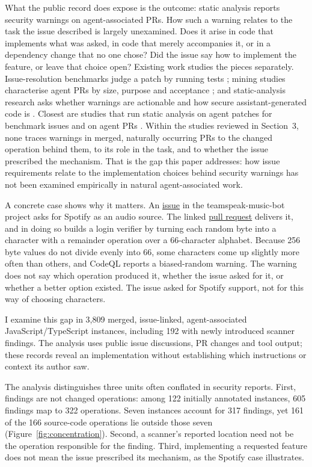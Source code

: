 \documentclass[acmsmall,screen,nonacm]{acmart}
\begin{document}
What the public record does expose is the outcome: static analysis reports security warnings on agent-associated PRs. How such a warning relates to the task the issue described is largely unexamined. Does it arise in code that implements what was asked, in code that merely accompanies it, or in a dependency change that no one chose? Did the issue say how to implement the feature, or leave that choice open? Existing work studies the pieces separately. Issue-resolution benchmarks judge a patch by running tests \cite{b9}; mining studies characterise agent PRs by size, purpose and acceptance \cite{b11,b21}; and static-analysis research asks whether warnings are actionable and how secure assistant-generated code is \cite{b32,b33,b34,b35}. Closest are studies that run static analysis on agent patches for benchmark issues \cite{b36} and on agent PRs \cite{b37}. Within the studies reviewed in Section~3, none traces warnings in merged, naturally occurring PRs to the changed operation behind them, to its role in the task, and to whether the issue prescribed the mechanism. That is the gap this paper addresses: how issue requirements relate to the implementation choices behind security warnings has not been examined empirically in natural agent-associated work.

A concrete case shows why it matters. An \href{https://github.com/ZHANGTIANYAO1/teamspeak-music-bot/issues/112}{issue} in the teamspeak-music-bot project asks for Spotify as an audio source. The linked \href{https://github.com/ZHANGTIANYAO1/teamspeak-music-bot/pull/118}{pull request} delivers it, and in doing so builds a login verifier by turning each random byte into a character with a remainder operation over a 66-character alphabet. Because 256 byte values do not divide evenly into 66, some characters come up slightly more often than others, and CodeQL reports a biased-random warning. The warning does not say which operation produced it, whether the issue asked for it, or whether a better option existed. The issue asked for Spotify support, not for this way of choosing characters.

I examine this gap in 3,809 merged, issue-linked, agent-associated JavaScript/\allowbreak TypeScript instances, including 192 with newly introduced scanner findings. The analysis uses public issue discussions, PR changes and tool output; these records reveal an implementation without establishing which instructions or context its author saw.

The analysis distinguishes three units often conflated in security reports. First, findings are not changed operations: among 122 initially annotated instances, 605 findings map to 322 operations. Seven instances account for 317 findings, yet 161 of the 166 source-code operations lie outside those seven (Figure~\ref{fig:concentration}). Second, a scanner's reported location need not be the operation responsible for the finding. Third, implementing a requested feature does not mean the issue prescribed its mechanism, as the Spotify case illustrates.
\end{document}
